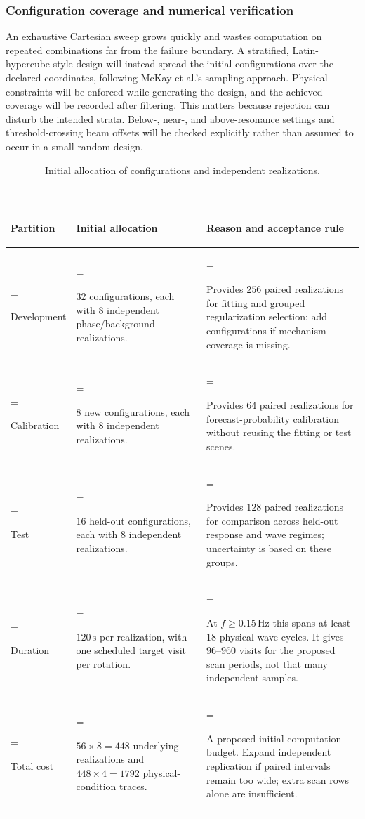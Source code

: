 \documentclass[10pt,letterpaper]{article}
\begin{document}
\subsubsection{Configuration coverage and numerical verification}

An exhaustive Cartesian sweep grows quickly and wastes computation on repeated combinations far from the failure boundary. A stratified, Latin-hypercube-style design will instead spread the initial configurations over the declared coordinates, following McKay et al.'s sampling approach. \cite{McKay1979LatinHypercube} Physical constraints will be enforced while generating the design, and the achieved coverage will be recorded after filtering. This matters because rejection can disturb the intended strata. Below-, near-, and above-resonance settings and threshold-crossing beam offsets will be checked explicitly rather than assumed to occur in a small random design.

\begin{table}[H]
\centering
\caption{Initial allocation of configurations and independent realizations.}
\label{tab:replication-budget}
\small
\begin{tabularx}{\textwidth}{@{}>{\hsize=0.6\hsize\linewidth=\hsize\raggedright\arraybackslash}X>{\hsize=1.15\hsize\linewidth=\hsize\raggedright\arraybackslash}X>{\hsize=1.25\hsize\linewidth=\hsize\raggedright\arraybackslash}X@{}}
\toprule
Partition & Initial allocation & Reason and acceptance rule \\
\midrule
Development & $32$ configurations, each with $8$ independent phase/background realizations. & Provides $256$ paired realizations for fitting and grouped regularization selection; add configurations if mechanism coverage is missing. \\
Calibration & $8$ new configurations, each with $8$ independent realizations. & Provides $64$ paired realizations for forecast-probability calibration without reusing the fitting or test scenes. \\
Test & $16$ held-out configurations, each with $8$ independent realizations. & Provides $128$ paired realizations for comparison across held-out response and wave regimes; uncertainty is based on these groups. \\
Duration & $120\,\mathrm{s}$ per realization, with one scheduled target visit per rotation. & At $f\geq0.15\,\mathrm{Hz}$ this spans at least $18$ physical wave cycles. It gives $96$--$960$ visits for the proposed scan periods, not that many independent samples. \\
Total cost & $56\times8=448$ underlying realizations and $448\times4=1792$ physical-condition traces. & A proposed initial computation budget. Expand independent replication if paired intervals remain too wide; extra scan rows alone are insufficient. \\
\bottomrule
\end{tabularx}
\end{table}
\end{document}
